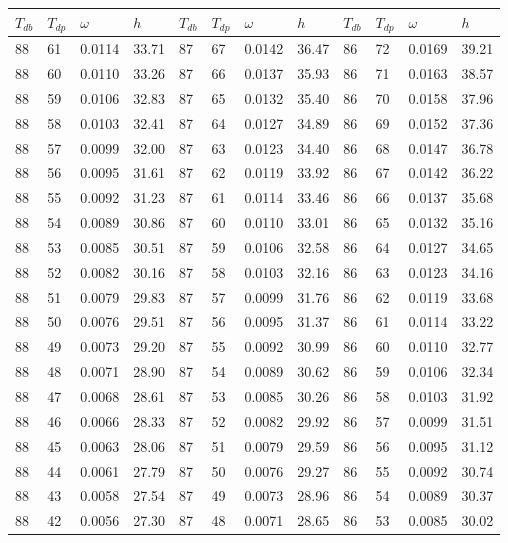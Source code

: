 \begin{tabular}{llll|llll|llll}
 \toprule 
\(T_{db}\) & \(T_{dp}\) & \(\omega\) & \(h\) & \(T_{db}\) & \(T_{dp}\) & \(\omega\) & \(h\) & \(T_{db}\) & \(T_{dp}\) & \(\omega\) & \(h\)  \\ \midrule 
88 & 61 & 0.0114 & 33.71 & 87 & 67 & 0.0142 & 36.47 & 86 & 72 & 0.0169 & 39.21\\
88 & 60 & 0.0110 & 33.26 & 87 & 66 & 0.0137 & 35.93 & 86 & 71 & 0.0163 & 38.57\\
88 & 59 & 0.0106 & 32.83 & 87 & 65 & 0.0132 & 35.40 & 86 & 70 & 0.0158 & 37.96\\
88 & 58 & 0.0103 & 32.41 & 87 & 64 & 0.0127 & 34.89 & 86 & 69 & 0.0152 & 37.36\\
88 & 57 & 0.0099 & 32.00 & 87 & 63 & 0.0123 & 34.40 & 86 & 68 & 0.0147 & 36.78\\
88 & 56 & 0.0095 & 31.61 & 87 & 62 & 0.0119 & 33.92 & 86 & 67 & 0.0142 & 36.22\\
88 & 55 & 0.0092 & 31.23 & 87 & 61 & 0.0114 & 33.46 & 86 & 66 & 0.0137 & 35.68\\
88 & 54 & 0.0089 & 30.86 & 87 & 60 & 0.0110 & 33.01 & 86 & 65 & 0.0132 & 35.16\\
88 & 53 & 0.0085 & 30.51 & 87 & 59 & 0.0106 & 32.58 & 86 & 64 & 0.0127 & 34.65\\
88 & 52 & 0.0082 & 30.16 & 87 & 58 & 0.0103 & 32.16 & 86 & 63 & 0.0123 & 34.16\\
88 & 51 & 0.0079 & 29.83 & 87 & 57 & 0.0099 & 31.76 & 86 & 62 & 0.0119 & 33.68\\
88 & 50 & 0.0076 & 29.51 & 87 & 56 & 0.0095 & 31.37 & 86 & 61 & 0.0114 & 33.22\\
88 & 49 & 0.0073 & 29.20 & 87 & 55 & 0.0092 & 30.99 & 86 & 60 & 0.0110 & 32.77\\
88 & 48 & 0.0071 & 28.90 & 87 & 54 & 0.0089 & 30.62 & 86 & 59 & 0.0106 & 32.34\\
88 & 47 & 0.0068 & 28.61 & 87 & 53 & 0.0085 & 30.26 & 86 & 58 & 0.0103 & 31.92\\
88 & 46 & 0.0066 & 28.33 & 87 & 52 & 0.0082 & 29.92 & 86 & 57 & 0.0099 & 31.51\\
88 & 45 & 0.0063 & 28.06 & 87 & 51 & 0.0079 & 29.59 & 86 & 56 & 0.0095 & 31.12\\
88 & 44 & 0.0061 & 27.79 & 87 & 50 & 0.0076 & 29.27 & 86 & 55 & 0.0092 & 30.74\\
88 & 43 & 0.0058 & 27.54 & 87 & 49 & 0.0073 & 28.96 & 86 & 54 & 0.0089 & 30.37\\
88 & 42 & 0.0056 & 27.30 & 87 & 48 & 0.0071 & 28.65 & 86 & 53 & 0.0085 & 30.02\\

\end{tabular}
